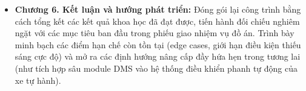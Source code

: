 \documentclass[../DoAn.tex]{subfiles}
\begin{document}
\begin{itemize}
    \item \textbf{Chương 6. Kết luận và hướng phát triển:} Đóng gói lại công trình bằng cách tổng kết các kết quả khoa học đã đạt được, tiến hành đối chiếu nghiêm ngặt với các mục tiêu ban đầu trong phiếu giao nhiệm vụ đồ án. Trình bày minh bạch các điểm hạn chế còn tồn tại (edge cases, giới hạn điều kiện thiếu sáng cực độ) và mở ra các định hướng nâng cấp đầy hứa hẹn trong tương lai (như tích hợp sâu module DMS vào hệ thống điều khiển phanh tự động của xe tự hành).
\end{itemize}
\end{document}

